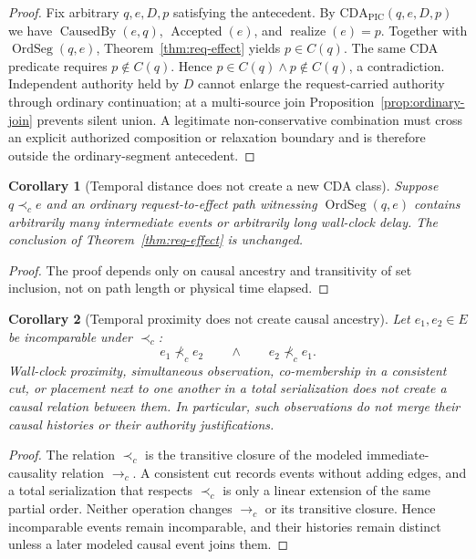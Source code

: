 \documentclass[10pt,twocolumn]{article}
\newcommand{\CausedBy}{\operatorname{CausedBy}}
\newcommand{\Realize}{\operatorname{realize}}
\newcommand{\Accepted}{\operatorname{Accepted}}
\newcommand{\hb}{\prec_{c}}
\newcommand{\OrdSeg}{\operatorname{OrdSeg}}
\newcommand{\CDApic}{\mathrm{CDA}_{\mathrm{PIC}}}
\newtheorem{corollary}{Corollary}
\begin{document}
\begin{proof}
Fix arbitrary $q,e,D,p$ satisfying the antecedent.  By
$\CDApic(q,e,D,p)$ we have $\CausedBy(e,q)$, $\Accepted(e)$, and
$\Realize(e)=p$.  Together with $\OrdSeg(q,e)$,
Theorem~\ref{thm:req-effect} yields $p\in C(q)$.  The same CDA predicate
requires $p\notin C(q)$.  Hence $p\in C(q)\land p\notin C(q)$, a
contradiction.  Independent authority held by $D$ cannot enlarge the
request-carried authority through ordinary continuation; at a multi-source
join Proposition~\ref{prop:ordinary-join} prevents silent union.  A legitimate
non-conservative combination must cross an explicit authorized composition or
relaxation boundary and is therefore outside the ordinary-segment antecedent.
\end{proof}

\begin{corollary}[Temporal distance does not create a new CDA class]
Suppose $q\hb e$ and an ordinary request-to-effect path witnessing
$\OrdSeg(q,e)$ contains arbitrarily many intermediate events or arbitrarily long
wall-clock delay.  The conclusion of Theorem~\ref{thm:req-effect} is unchanged.
\end{corollary}

\begin{proof}
The proof depends only on causal ancestry and transitivity of set inclusion,
not on path length or physical time elapsed.
\end{proof}

\begin{corollary}[Temporal proximity does not create causal ancestry]
\label{cor:temporal-proximity}
Let $e_1,e_2\in E$ be incomparable under $\hb$:
\begin{equation}
  e_1\not\hb e_2\qquad\land\qquad e_2\not\hb e_1.
\end{equation}
Wall-clock proximity, simultaneous observation, co-membership in a consistent
cut, or placement next to one another in a total serialization does not create
a causal relation between them.  In particular, such observations do not merge
their causal histories or their authority justifications.
\end{corollary}

\begin{proof}
The relation $\hb$ is the transitive closure of the modeled immediate-causality
relation $\to_c$.  A consistent cut records events without adding edges, and a
total serialization that respects $\hb$ is only a linear extension of the same
partial order.  Neither operation changes $\to_c$ or its transitive closure.
Hence incomparable events remain incomparable, and their histories remain
distinct unless a later modeled causal event joins them.
\end{proof}
\end{document}
